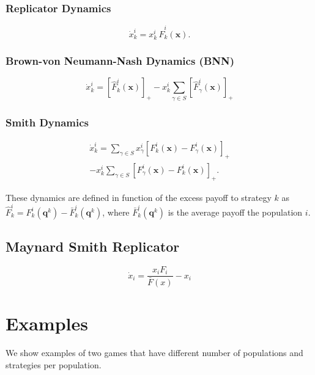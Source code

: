 \documentclass[a4paper,10pt]{article}
\newcommand{\bs}[1]{\boldsymbol{#1}}
\begin{document}
\subsubsection{Replicator Dynamics}
\begin{equation}\label{eq:replicator}
\dot{x}_k^i = x_k^i \, \hat{F}_k^i \left( \bs{x} \right).
\end{equation}

\subsubsection{Brown-von Neumann-Nash Dynamics (BNN)}
\begin{equation}\label{eq:bnn}
 \dot{x}_k^i = \left[ \hat{F}_k^i \left( \bs{x} \right) \right]_+ - x_k^i  \sum_{\gamma \in S} \left[ \hat{F}_\gamma^i \left( \bs{x} \right) \right]_+
\end{equation}

\subsubsection{Smith Dynamics}
\begin{multline}
\dot{x}_k^i  = \sum_{\gamma \in S} x_\gamma^i  \left[ F_k^i \left( \bs{x} \right) - F_\gamma^i \left( \bs{x} \right) \right]_+ 
\\
- x_k^i  \sum_{\gamma \in S} \left[ F_\gamma^i ( \bs{x}) - F_k^i( \bs{x} ) \right]_+.
\label{eq:smith}
\end{multline}



These dynamics are defined in function of the excess payoff to strategy $k$ as $\hat{F}_k^i =  F_k^i(\bs{q}^k) - \bar{F}_k^i(\bs{q}^k)$,
where $\bar{F}_k^i(\bs{q}^k)$ is the average payoff the population $i$.







\subsection{Maynard Smith Replicator}

\begin{equation}
\dot{x}_i = \frac{ x_i F_i }{ \bar{F}(x) } - x_i
\end{equation}






\section{Examples}
We show examples of two games that have different number of populations and strategies per population.
\end{document}
